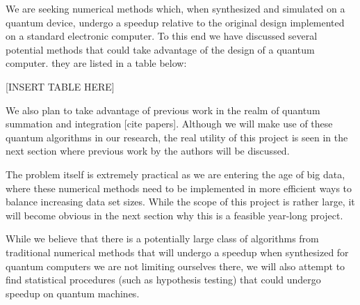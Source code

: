 


We are seeking numerical methods which, when synthesized and simulated on a quantum device, undergo a speedup relative to the original design implemented on a standard electronic computer. To this end we have discussed several potential methods that could take advantage of the design of a quantum computer. they are listed in a table below: 

[INSERT TABLE HERE]

We also plan to take advantage of previous work in the realm of quantum summation and integration [cite papers]. Although we will make use of these quantum algorithms in our research, the real utility of this project is seen in the next section where previous work by the authors will be discussed. 

The problem itself is extremely practical as we are entering the age of big data, where these numerical methods need to be implemented in more efficient ways to balance increasing data set sizes. While the scope of this project is rather large, it will become obvious in the next section why this is a feasible year-long project. 

While we believe that there is a potentially large class of algorithms from traditional numerical methods that will undergo a speedup when synthesized for quantum computers we are not limiting ourselves there, we will also attempt to find statistical procedures (such as hypothesis testing) that could undergo speedup on quantum machines. 

